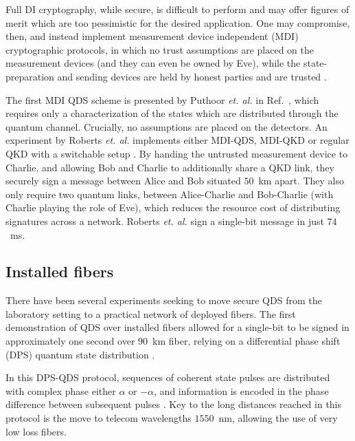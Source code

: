 Full DI cryptography, while secure, is difficult to perform and may offer figures of merit which are too pessimistic for the desired application. One may compromise, then, and instead implement measurement device independent (MDI) cryptographic protocols, in which no trust assumptions are placed on the measurement devices (and they can even be owned by Eve), while the state-preparation and sending devices are held by honest parties and are trusted \cite{Lo2012}.

The first MDI QDS scheme is presented by Puthoor \emph{et. al.} in Ref.~\cite{Puthoor2016}, which requires only a characterization of the states which are distributed through the quantum channel. Crucially, no assumptions are placed on the detectors. An experiment by Roberts \emph{et. al.} implements either MDI-QDS, MDI-QKD or regular QKD with a switchable setup \cite{Roberts2017}. By handing the untrusted measurement device to Charlie, and allowing Bob and Charlie to additionally share a QKD link, they securely sign a message between Alice and Bob situated $50$~km apart. They also only require two quantum links, between Alice-Charlie and Bob-Charlie (with Charlie playing the role of Eve), which reduces the resource cost of distributing signatures across a network. Roberts \emph{et. al.} sign a single-bit message in just $74$~ms. %





\subsection{Installed fibers}
There have been several experiments seeking to move secure QDS from the laboratory setting to a practical network of deployed fibers. The first demonstration of QDS over installed fibers \cite{Collins2016} allowed for a single-bit to be signed in approximately one second over $90$~km fiber, relying on a differential phase shift (DPS) quantum state distribution \cite{Inoue2002}.

In this DPS-QDS protocol, sequences of coherent state pulses are distributed with complex phase either $\alpha$ or $- \alpha$, and information is encoded in the phase difference between subsequent pulses \cite{Inoue2015}. Key to the long distances reached in this protocol is the move to telecom wavelengths $1550$~nm, allowing the use of very low loss fibers. 


